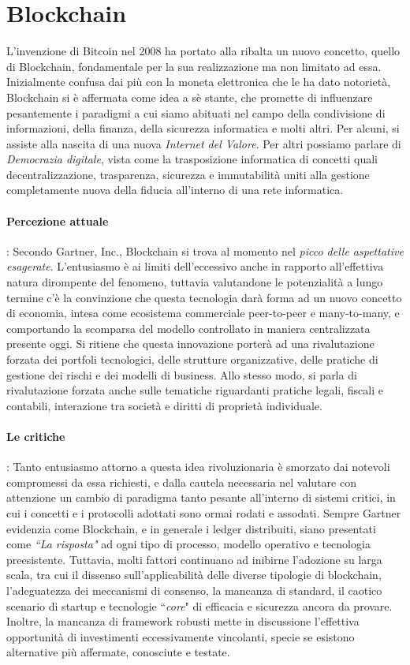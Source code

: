 \section{Blockchain}
	L'invenzione di Bitcoin nel 2008 ha portato alla ribalta un nuovo concetto, quello di Blockchain, fondamentale per la sua realizzazione ma non limitato ad essa. Inizialmente confusa dai più con la moneta elettronica che le ha dato notorietà,  Blockchain si è affermata come idea a sè stante, che promette di influenzare pesantemente i paradigmi a cui siamo abituati nel campo della condivisione di informazioni, della finanza, della sicurezza informatica e molti altri. Per alcuni, si assiste alla nascita di una nuova \emph{Internet del Valore}. Per altri possiamo parlare di \emph{Democrazia digitale}, vista come la trasposizione informatica di concetti quali decentralizzazione, trasparenza, sicurezza e immutabilità uniti alla gestione completamente nuova della fiducia all'interno di una rete informatica. \\
	\paragraph{Percezione attuale}: Secondo Gartner, Inc.\cite{gartner}, Blockchain si trova al momento nel \emph{picco delle aspettative esagerate}. L'entusiasmo è ai limiti dell'eccessivo anche in rapporto all'effettiva natura dirompente del fenomeno, tuttavia valutandone le potenzialità a lungo termine c'è la convinzione che questa tecnologia darà forma ad un nuovo concetto di economia, intesa come ecosistema commerciale peer-to-peer e many-to-many, e comportando la scomparsa del modello controllato in maniera centralizzata presente oggi. Si ritiene che questa innovazione porterà ad una rivalutazione forzata dei portfoli tecnologici, delle strutture organizzative, delle pratiche di gestione dei rischi e dei modelli di business. Allo stesso modo, si parla di rivalutazione forzata anche sulle tematiche riguardanti pratiche legali, fiscali e contabili, interazione tra società e diritti di proprietà individuale.
	\paragraph{Le critiche}: Tanto entusiasmo attorno a questa idea rivoluzionaria è smorzato dai notevoli compromessi da essa richiesti, e dalla cautela necessaria nel valutare con attenzione un cambio di paradigma tanto pesante all'interno di sistemi critici, in cui i concetti e i protocolli adottati sono ormai rodati e assodati. Sempre Gartner evidenzia come Blockchain, e in generale i ledger distribuiti, siano presentati come \emph{``La risposta"} ad ogni tipo di processo, modello operativo e tecnologia preesistente. Tuttavia, molti fattori continuano ad inibirne l'adozione su larga scala, tra cui il dissenso sull'applicabilità delle diverse tipologie di blockchain, l'adeguatezza dei meccanismi di consenso, la mancanza di standard, il caotico scenario di startup e tecnologie ``\emph{core}" di efficacia e sicurezza ancora da provare. Inoltre, la mancanza di framework robusti mette in discussione l'effettiva opportunità di investimenti eccessivamente vincolanti, specie se esistono alternative più affermate, conosciute e testate.

